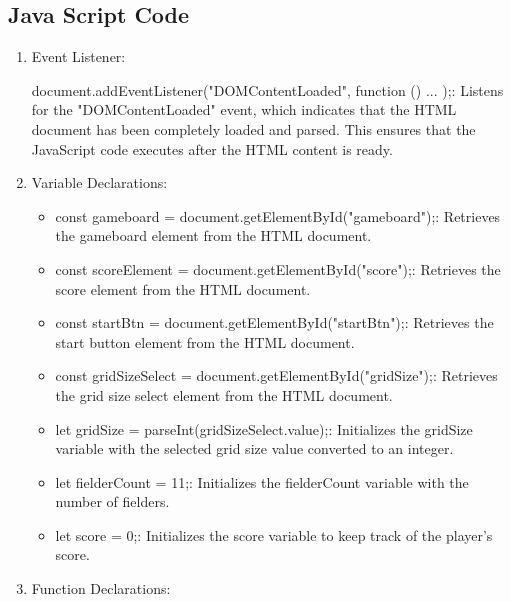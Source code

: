 \documentclass{article}
\begin{document}
\subsection{Java Script Code}
\begin{enumerate}
    \item Event Listener:

document.addEventListener("DOMContentLoaded", function () { ... });: Listens for the "DOMContentLoaded" event, which indicates that the HTML document has been completely loaded and parsed. This ensures that the JavaScript code executes after the HTML content is ready.
\item Variable Declarations:
\begin{itemize}


    \item const gameboard = document.getElementById("gameboard");: Retrieves the gameboard element from the HTML document.
    \item const scoreElement = document.getElementById("score");: Retrieves the score element from the HTML document.
    \item const startBtn = document.getElementById("startBtn");: Retrieves the start button element from the HTML document.
    \item const gridSizeSelect = document.getElementById("gridSize");: Retrieves the grid size select element from the HTML document.
    \item let gridSize = parseInt(gridSizeSelect.value);: Initializes the gridSize variable with the selected grid size value converted to an integer.
    \item let fielderCount = 11;: Initializes the fielderCount variable with the number of fielders.
    \item let score = 0;: Initializes the score variable to keep track of the player's score.
\end{itemize}
\item Function Declarations:
\begin{itemize}



\end{itemize}
\end{enumerate}
\end{document}
